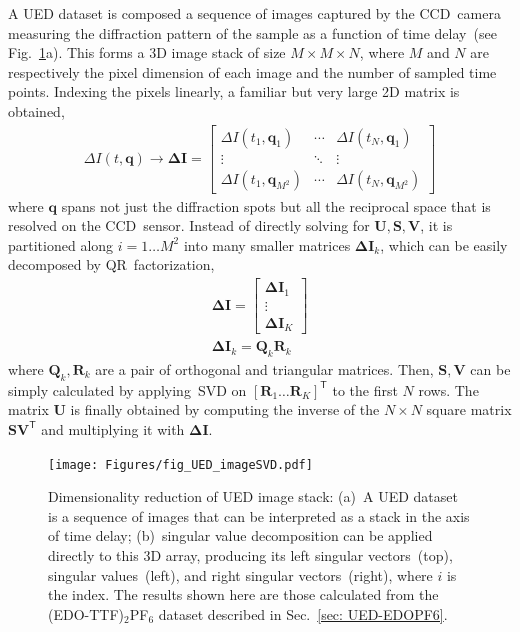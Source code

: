 A UED dataset is composed a sequence of images captured by the CCD~camera
measuring the diffraction pattern of the sample as a function of time delay~(see Fig.~\ref{fig: UED-SVD}a).
This forms a 3D image stack of size $M \times M \times N$,
where $M$ and $N$ are respectively the pixel dimension of each image and the number of sampled time points.
%
Indexing the pixels linearly, a familiar but very large 2D matrix is obtained,
%
\begin{equation}
  \begin{aligned}
    \Delta I(t, \boldsymbol{q}) \rightarrow \mathbf{\Delta I} =
    \begin{bmatrix}
        \Delta I(t_1, \boldsymbol{q}_1) & \cdots & \Delta I(t_N, \boldsymbol{q}_1) \\
        \vdots & \ddots & \vdots \\
        \Delta I(t_1, \boldsymbol{q}_{M^2}) & \cdots & \Delta I(t_N, \boldsymbol{q}_{M^2})
    \end{bmatrix}
  \end{aligned}
\end{equation}
%
where $\boldsymbol{q}$ spans not just the diffraction spots but all the reciprocal space
that is resolved on the CCD~sensor.
%
Instead of directly solving for $\mathbf{U}, \mathbf{S}, \mathbf{V}$,
it is partitioned along $i = 1 \dots M^2$ into many smaller matrices $\mathbf{\Delta I}_k$,
which can be easily decomposed by QR~factorization,
%
\begin{equation}
  \begin{aligned}
    \mathbf{\Delta I} =
    \begin{bmatrix}
        \mathbf{\Delta I}_1 \\
        \vdots \\
        \mathbf{\Delta I}_K
    \end{bmatrix} \\
    \mathbf{\Delta I}_k = \mathbf{Q}_k \mathbf{R}_k
  \end{aligned}
\end{equation}
%
where $\mathbf{Q}_k, \mathbf{R}_k$ are a pair of orthogonal and triangular matrices.
%
Then, $\mathbf{S}, \mathbf{V}$ can be simply calculated by applying~SVD
on $[ \mathbf{R}_1 \dots \mathbf{R}_K ]^\mathsf{T}$ to the first $N$ rows.
%
The matrix $\mathbf{U}$ is finally obtained
by computing the inverse of the $N \times N$ square matrix $\mathbf{S} \mathbf{V}^\mathsf{T}$
and multiplying it with $\mathbf{\Delta I}$.

\begin{figure}[t!]
  \centering
  \texttt{[image: Figures/fig\_UED\_imageSVD.pdf]}
  \caption[Dimensionality reduction of UED image stack.]{
    Dimensionality reduction of UED image stack:
    (a)~A UED dataset is a sequence of images that can be interpreted
    as a stack in the axis of time delay;
    (b)~singular value decomposition can be applied directly to this 3D array,
    producing its left singular vectors~(top), singular values~(left),
    and right singular vectors~(right), where $i$ is the index.
    The results shown here are those calculated from the (EDO-TTF)$_2$PF$_6$ dataset
    described in Sec.~\ref{sec: UED-EDOPF6}.
  }
  \label{fig: UED-SVD}
\end{figure}

